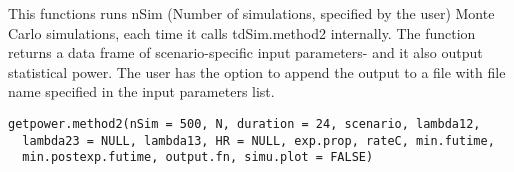 \documentclass[a4paper]{book}
\begin{document}
%
\begin{Description}\relax

This functions runs nSim (Number of simulations, specified by the user) Monte Carlo simulations, each time it calls tdSim.method2 internally. The function returns a data frame of scenario-specific input parameters- and it also output statistical power. The user has the option to append the output to a file with file name specified in the input parameters list.
\end{Description}
%
\begin{Usage}
\begin{verbatim}
getpower.method2(nSim = 500, N, duration = 24, scenario, lambda12,
  lambda23 = NULL, lambda13, HR = NULL, exp.prop, rateC, min.futime, 
  min.postexp.futime, output.fn, simu.plot = FALSE)
\end{verbatim}
\end{Usage}
%
\end{document}
